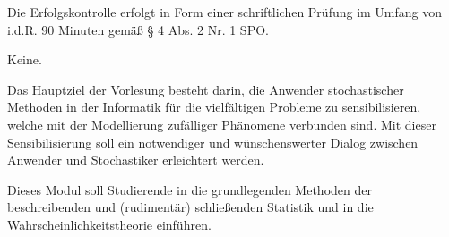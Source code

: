 \begin{course}

\setdoclanguagegerman
{}



\coursehead


\label{cour_7235.dp_997}


\begin{styleenv}
\begin{assessment}
Die Erfolgskontrolle erfolgt in Form einer schriftlichen Prüfung im Umfang von i.d.R. 90 Minuten gemäß § 4 Abs. 2 Nr. 1 SPO.


\end{assessment}

\begin{conditions}Keine.\end{conditions}


\end{styleenv}

\begin{learningoutcomes}
Das Hauptziel der Vorlesung besteht darin, die Anwender stochastischer Methoden in der Informatik für die vielfältigen Probleme zu sensibilisieren, welche mit der Modellierung zufälliger Phänomene verbunden sind. Mit dieser Sensibilisierung soll ein notwendiger und wünschenswerter Dialog zwischen Anwender und Stochastiker erleichtert werden.


\end{learningoutcomes}

\begin{content}
Dieses Modul soll Studierende in die grundlegenden Methoden der beschreibenden und (rudimentär) schließenden Statistik und in die Wahrscheinlichkeitstheorie einführen.


\end{content}
\end{course}
